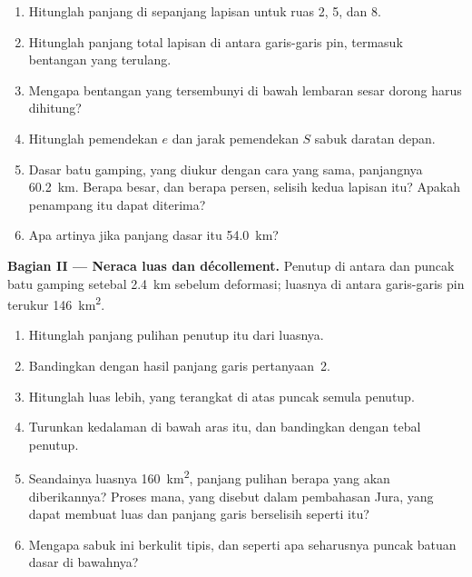 \begin{problem}
\begin{enumerate}
\item Hitunglah panjang di sepanjang lapisan untuk ruas 2, 5, dan 8.
\item Hitunglah panjang total lapisan di antara garis-garis pin, termasuk bentangan yang
terulang.
\item Mengapa bentangan yang tersembunyi di bawah lembaran sesar dorong harus dihitung?
\item Hitunglah pemendekan $e$ dan jarak pemendekan $S$ sabuk daratan depan.
\item Dasar batu gamping, yang diukur dengan cara yang sama, panjangnya \qty{60.2}{km}. Berapa besar,
dan berapa persen, selisih kedua lapisan itu? Apakah penampang itu dapat diterima?
\item Apa artinya jika panjang dasar itu \qty{54.0}{km}?
\end{enumerate}

\noindent\textbf{Bagian II --- Neraca luas dan décollement.} Penutup di antara
 dan puncak batu gamping setebal \qty{2.4}{km} sebelum deformasi; luasnya
di antara garis-garis pin terukur \qty{146}{km^2}.
\begin{enumerate}[resume]
\item Hitunglah panjang pulihan penutup itu dari luasnya.
\item Bandingkan dengan hasil panjang garis pertanyaan~2.
\item Hitunglah luas lebih, yang terangkat di atas puncak semula penutup.
\item Turunkan kedalaman  di bawah aras itu, dan bandingkan dengan tebal
penutup.
\item Seandainya luasnya \qty{160}{km^2}, panjang pulihan berapa yang akan diberikannya? Proses mana,
yang disebut dalam pembahasan Jura, yang dapat membuat luas dan panjang garis berselisih seperti itu?
\item Mengapa sabuk ini berkulit tipis, dan seperti apa seharusnya puncak batuan dasar
di bawahnya?
\end{enumerate}


\end{problem}
